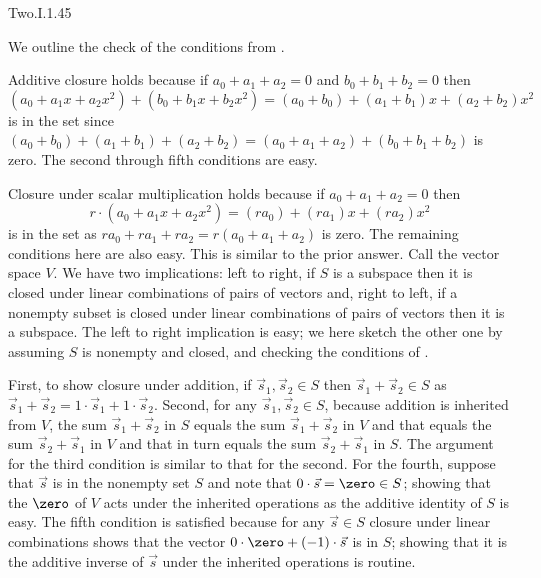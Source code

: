 \begin{ans}{Two.I.1.45}
      \begin{exparts}
        \partsitem We outline the check of the conditions from
          .

          Additive closure holds because if \( a_0+a_1+a_2=0 \)
          and \( b_0+b_1+b_2=0 \) then
          \begin{equation*}
            (a_0+a_1x+a_2x^2)+(b_0+b_1x+b_2x^2)=
            (a_0+b_0)+(a_1+b_1)x+(a_2+b_2)x^2
          \end{equation*}
          is in the set since
          \( (a_0+b_0)+(a_1+b_1)+(a_2+b_2)=(a_0+a_1+a_2)+(b_0+b_1+b_2) \)
          is zero.
          The second through fifth conditions are easy.

          Closure under scalar multiplication holds because
          if \( a_0+a_1+a_2=0 \) then
          \begin{equation*}
            r\cdot(a_0+a_1x+a_2x^2)=
            (ra_0)+(ra_1)x+(ra_2)x^2
          \end{equation*}
          is in the set as \( ra_0+ra_1+ra_2=r(a_0+a_1+a_2) \) is zero.
          The remaining conditions here are also easy.
        \partsitem This is similar to the prior answer.
        \partsitem Call the vector space \( V \).
          We have two implications: left to right, if \( S \) is a subspace
          then it is closed under linear combinations of pairs of vectors and,
          right to left, if a nonempty subset is closed under linear
          combinations of pairs of vectors then it is a subspace.
          The left to right implication is easy; we here sketch the
          other one by
          assuming \( S \) is nonempty and closed, and checking the conditions
          of .

          First, to show closure under addition, if
          \( \vec{s}_1,\vec{s}_2\in S \) then \( \vec{s}_1+\vec{s}_2\in S \)
          as \( \vec{s}_1+\vec{s}_2=1\cdot\vec{s}_1+1\cdot\vec{s}_2 \).
          Second, for any \( \vec{s}_1,\vec{s}_2\in S \), because addition
          is inherited from \( V \), the sum \( \vec{s}_1+\vec{s}_2 \)
          in \( S \) equals the sum \( \vec{s}_1+\vec{s}_2 \)
          in \( V \) and that equals the sum \( \vec{s}_2+\vec{s}_1 \) in
          \( V \) and that in turn equals the sum \( \vec{s}_2+\vec{s}_1 \) in
          \( S \).
          The argument for the third condition is similar to that for the
          second.
          For the fourth, suppose that
          \( \vec{s} \) is in the nonempty set \( S \)
          and note that \( 0\cdot\vec{s}=\zero\in S \); showing that
          the \( \zero \) of
          \( V \) acts under the inherited operations as the additive identity
          of \( S \) is easy.
          The fifth condition is satisfied because for any \( \vec{s}\in S \)
          closure under linear combinations shows that the vector
          \( 0\cdot\zero+(-1)\cdot\vec{s} \) is in \( S \); showing
          that it is the
          additive inverse of \( \vec{s} \) under the inherited operations is
          routine.


\end{exparts}
\end{ans}
